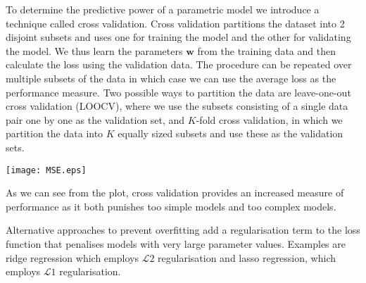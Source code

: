 \documentclass[english]{article}
\begin{document}
To determine the predictive power of a parametric model we introduce a technique called cross validation. Cross validation partitions the dataset into 2 disjoint subsets and uses one for training the model and the other for validating the model. We thus learn the parameters $\textbf{w}$ from the training data and then calculate the loss using the validation data. The procedure can be repeated over multiple subsets of the data in which case we can use the average loss as the performance measure. Two possible ways to partition the data are leave-one-out cross validation (LOOCV), where we use the subsets consisting of a single data pair one by one as the validation set, and $K$-fold cross validation, in which we partition the data into $K$ equally sized subsets and use these as the validation sets.
\begin{center}
	\texttt{[image: MSE.eps]}
\end{center}
As we can see from the plot, cross validation provides an increased measure of performance as it both punishes too simple models and too complex models.

Alternative approaches to prevent overfitting add a regularisation term to the loss function that penalises models with very large parameter values. Examples are ridge regression which employs $\mathcal{L}2$ regularisation and lasso regression, which employs $\mathcal{L}1$ regularisation.
\end{document}
